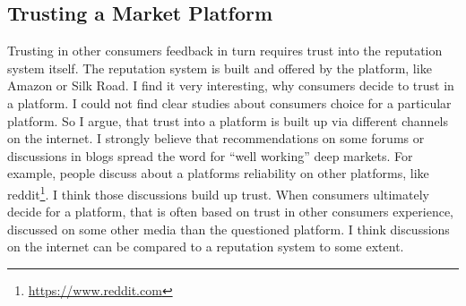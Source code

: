 \subsection{Trusting a Market Platform}

Trusting in other consumers feedback in turn requires trust into the reputation system itself. The reputation system is built and offered by the platform, like Amazon or Silk Road. I find it very interesting, why consumers decide to trust in a platform. I could not find clear studies about consumers choice for a particular platform. So I argue, that trust into a platform is built up via different channels on the internet. I strongly believe that recommendations on some forums or discussions in blogs spread the word for ``well working'' deep markets. For example, people discuss about a platforms reliability on other platforms, like reddit\footnote{\url{https://www.reddit.com}}. I think those discussions build up trust. When consumers ultimately decide for a platform, that is often based on trust in other consumers experience, discussed on some other media than the questioned platform. I think discussions on the internet can be compared to a reputation system to some extent.